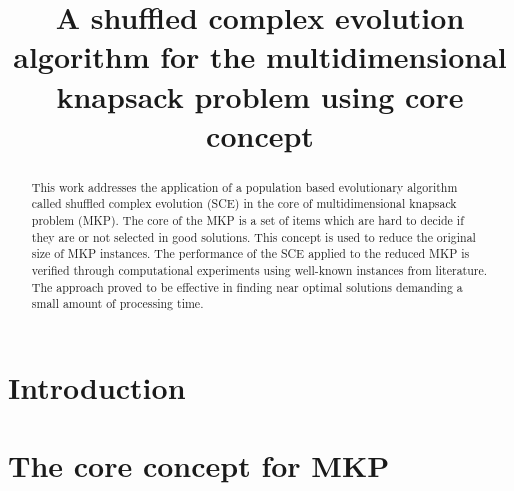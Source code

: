 \documentclass[10pt, conference, compsocconf]{IEEEtran}
\begin{document}
\title{ \vspace{0.25in}
A shuffled complex evolution algorithm for
the multidimensional knapsack problem using core concept}

\author{
\and
{}
}

\maketitle

\begin{abstract}
This work addresses the application of a population based evolutionary algorithm
called shuffled complex evolution (SCE) in the core of multidimensional knapsack
problem (MKP).
The core of the MKP is a set of items which are hard to decide if they are or
not selected in good solutions.
This concept is used to reduce the original size of MKP instances.
The performance of the SCE applied to the reduced MKP is verified through computational experiments
using well-known instances from literature.
The approach proved to be effective in finding near optimal solutions
demanding a small amount of processing time.
\end{abstract}
\IEEEpeerreviewmaketitle

\section{Introduction}
\label{sec:intro}


\section{The core concept for MKP}
\vspace*{-5pt}      %
\label{sec:core}

\end{document}
